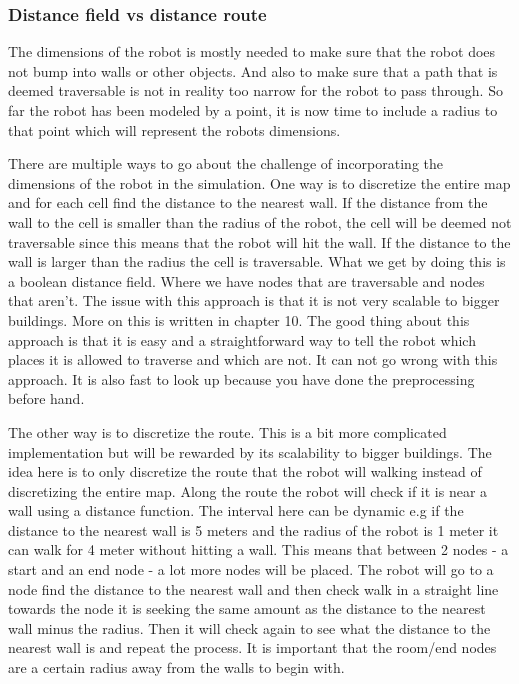 \subsubsection{Distance field vs distance route}
The dimensions of the robot is mostly needed to make sure that the robot does not bump into walls or other objects. And also to make sure that a path that is deemed traversable is not in reality too narrow for the robot to pass through.
So far the robot has been modeled by a point, it is now time to include a radius to that point which will represent the robots dimensions.

There are multiple ways to go about the challenge of incorporating the dimensions of the robot in the simulation. 
One way is to discretize the entire map and for each cell find the distance to the nearest wall. If the distance from the wall to the cell is smaller than the radius of the robot, the cell will be deemed not traversable since this means that the robot will hit the wall. If the distance to the wall is larger than the radius the cell is traversable. What we get by doing this is a boolean distance field. Where we have nodes that are traversable and nodes that aren't.
The issue with this approach is that it is not very scalable to bigger buildings. More on this is written in chapter 10.
The good thing about this approach is that it is easy and a straightforward way to tell the robot which places it is allowed to traverse and which are not. It can not go wrong with this approach. 
It is also fast to look up because you have done the preprocessing before hand.


The other way is to discretize the route. This is a bit more complicated implementation but will be rewarded by its scalability to bigger buildings. 
The idea here is to only discretize the route that the robot will walking instead of discretizing the entire map. 
Along the route the robot will check if it is near a wall using a distance function. The interval here can be dynamic e.g if the distance to the nearest wall is 5 meters and the radius of the robot is 1 meter it can walk for 4 meter without hitting a wall.
This means that between 2 nodes - a start and an end node - a lot more nodes will be placed. The robot will go to a node find the distance to the nearest wall and then check walk in a straight line towards the node it is seeking the same amount as the distance to the nearest wall minus the radius. Then it will check again to see what the distance to the nearest wall is and repeat the process. It is important that the room/end nodes are a certain radius away from the walls to begin with. 

